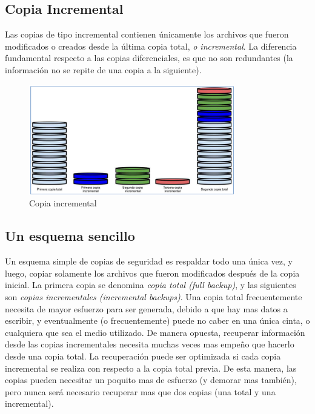 \documentclass[12pt]{article}
\begin{document}
\subsection*{Copia Incremental}
Las copias de tipo incremental contienen únicamente los archivos que fueron
modificados o creados desde la última copia total, {\it o incremental}. La 
diferencia fundamental respecto a las copias diferenciales, es que no son 
redundantes (la información no se repite de una copia a la siguiente).


\begin{figure}[h]
\centering
\includegraphics[width=0.8\textwidth]{incremental.png}
\renewcommand{\figurename}{Fig.}
\caption{Copia incremental}
\label{contexto:figura}
\end{figure}

\subsection*{Un esquema sencillo}

Un esquema simple de copias de seguridad es respaldar todo una única vez, 
y luego, copiar solamente los archivos que fueron modificados después de 
la copia inicial. La primera copia se denomina \textit{copia total (full 
backup)}, y las siguientes son \textit{copias incrementales 
(incremental backups)}. Una copia total frecuentemente necesita de mayor 
esfuerzo para ser generada, debido a que hay mas datos a escribir,
y eventualmente (o frecuentemente) puede no caber en una única cinta, o 
cualquiera que sea el medio utilizado.
De manera opuesta, recuperar información desde las copias
incrementales necesita muchas veces mas empeño que hacerlo desde una copia 
total. La recuperación puede ser optimizada si cada copia incremental se 
realiza con respecto a la copia total previa. De esta manera, las copias 
pueden necesitar un poquito mas de esfuerzo (y demorar mas también), 
pero nunca será necesario recuperar mas que dos copias (una total y una 
incremental).
\end{document}
